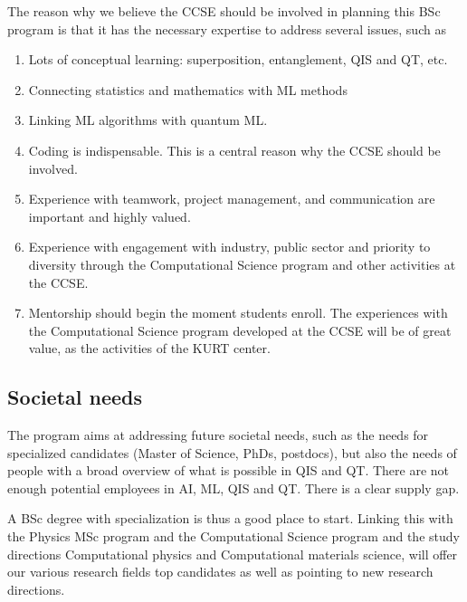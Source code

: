 \documentclass[%
oneside,                 %
final,                   %
10pt]{article}
\begin{document}
\vspace{6mm}

The reason why we believe the CCSE should be involved in planning this BSc program is that it has the necessary expertise to address several issues, such as

\begin{enumerate}
\item Lots of conceptual learning: superposition, entanglement, QIS and QT, etc. 

\item Connecting statistics and mathematics with ML methods

\item Linking ML algorithms with quantum ML.

\item Coding is indispensable. This is a central reason why the CCSE should be involved.

\item Experience with teamwork, project management, and communication are important and highly valued.

\item Experience with engagement with industry, public sector and priority to diversity through the Computational Science program and other activities at the CCSE.

\item Mentorship should begin the moment students enroll. The experiences with the Computational Science program developed at the CCSE will be of great value, as the activities of the KURT center.
\end{enumerate}

\noindent
\subsection*{Societal needs}

The program aims at addressing future societal needs, such as the
needs for specialized candidates (Master of Science, PhDs, postdocs),
but also the needs of people with a broad overview of what is possible
in QIS and QT. There are not enough potential employees in AI, ML, QIS
and QT. There is a clear supply gap.

A BSc degree with specialization is thus a good place to
start. Linking this with the Physics MSc program and the Computational
Science program and the study directions Computational physics and
Computational materials science, will offer our various research
fields top candidates as well as pointing to new research directions.
\end{document}
